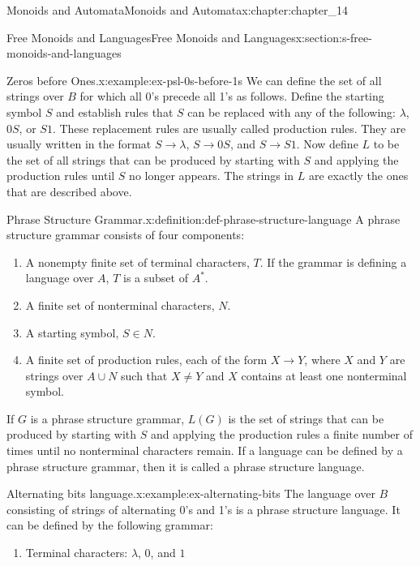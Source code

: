 \documentclass[twoside,10pt,]{book}
\numberwithin{equation}{section}
\begin{document}
\begin{chapterptx}{Monoids and Automata}{}{Monoids and Automata}{}{}{x:chapter:chapter_14}
\begin{sectionptx}{Free Monoids and Languages}{}{Free Monoids and Languages}{}{}{x:section:s-free-monoids-and-languages}
\begin{example}{Zeros before Ones.}{x:example:ex-psl-0s-before-1s}%
We can define the set of all strings over \(B\) for which all 0's precede all 1's as follows. Define the starting symbol \(S\) and establish rules that \(S\) can be replaced with any of the following: \(\lambda\), \(0S\), or \(S1\). These replacement rules are usually called production rules.  They are usually written in the format \(S\to \lambda\), \(S\to 0S\), and \(S\to S1\). Now define \(L\) to be the set of all strings that can be produced by starting with \(S\) and applying the production rules until \(S\) no longer appears. The strings in \(L\) are exactly the ones that are described above.%
\end{example}
\begin{definition}{Phrase Structure Grammar.}{x:definition:def-phrase-structure-language}%
%
\label{g:notation:idm404646906544}%
A phrase structure grammar consists of four components:%
\begin{enumerate}[label=(\arabic*)]
\item{}A nonempty finite set of terminal characters, \(T\). If the grammar is defining a language over \(A\), \(T\) is a subset of \(A^*\).%
\item{}A finite set of nonterminal characters, \(N\).%
\item{}A starting symbol,  \(S\in N\).%
\item{}A finite set of production rules, each of the form \(X\to Y\), where \(X\) and \(Y\) are strings over \(A\cup N\) such that \(X\neq Y\) and \(X\) contains at least one nonterminal symbol.%
\end{enumerate}
%
\par
If \(G\) is a phrase structure grammar, \(L(G)\)  is the set of strings that can be produced by starting with \(S\) and applying the production rules a finite number of times until no nonterminal characters remain. If a language can be defined by a phrase structure grammar, then it is called a phrase structure language.%
\end{definition}
\begin{example}{Alternating bits language.}{x:example:ex-alternating-bits}%
The language over \(B\) consisting of strings of alternating 0's and 1's is a phrase structure language. It can be defined by the following grammar:%
\begin{enumerate}[label=(\arabic*)]
\item{}Terminal characters: \(\lambda\), \(0\), and \(1\)%

\end{enumerate}
\end{example}
\end{sectionptx}
\end{chapterptx}
\end{document}
